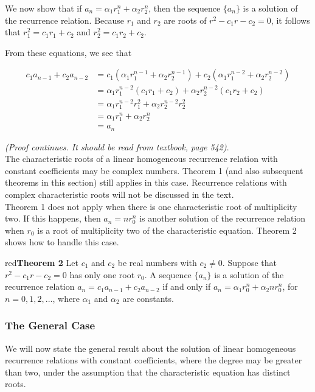 \documentclass[11pt]{article}
\newenvironment{theorem}[1]{\begin{mybox}{red}{\textbf{Theorem #1}}}{\end{mybox}}
\begin{document}
We now show that if $a_n = \alpha_1r^n_1 + \alpha_2r^n_2$, then the sequence $\{a_n\}$ is a solution of the recurrence relation. Because $r_1$ and $r_2$ are roots of $r^2 - c_1r - c_2 = 0$, it follows that $r^2_1 = c_1r_1 + c_2$ and $r^2_2 = c_1r_2 + c_2$.

From these equations, we see that

\begin{align*}
    c_1a_{n-1} + c_2a_{n-2} &= c_1(\alpha_1r^{n-1}_1 + \alpha_2r^{n-1}_2) + c_2(\alpha_1r_1^{n-2} + \alpha_2r_2^{n-2})\\
    &= \alpha_1r^{n-2}_1(c_1r_1 + c_2) + \alpha_2r^{n-2}_2(c_1r_2 + c_2)\\
    &= \alpha_1r^{n-2}_1r_1^2 + \alpha_2r^{n-2}_2r_2^2\\
    &= \alpha_1r^n_1 + \alpha_2r^n_2\\
    &= a_n
\end{align*}

\textit{(Proof continues. It should be read from textbook, page 542)}.\\

The characteristic roots of a linear homogeneous recurrence relation with constant coefficients may be complex numbers. Theorem 1 (and also subsequent theorems in this section) still applies in this case. Recurrence relations with complex characteristic roots will not be discussed in the text. \\

Theorem 1 does not apply when there is one characteristic root of multiplicity two. If this happens, then $a_n = nr^n_0$ is another solution of the recurrence relation when $r_0$ is a root of multiplicity two of the characteristic equation. Theorem 2 shows how to handle this case.

\begin{theorem}{2}
Let $c_1$ and $c_2$ be real numbers with $c_2 \neq 0$. Suppose that $r^2 - c_1 r - c_2 = 0$ has only one root $r_0$. A sequence $\{a_n\}$ is a solution of the recurrence relation $a_n = c_1a_{n-1} + c_2a_{n-2}$ if and only if $a_n = \alpha_1 r^n_0 + \alpha_2 nr^n_0$, for $n = 0, 1, 2, ...$, where $\alpha_1$ and $\alpha_2$ are constants.
\end{theorem}

\subsubsection{The General Case}

We will now state the general result about the solution of linear homogeneous recurrence relations with constant coefficients, where the degree may be greater than two, under the assumption that the characteristic equation has distinct roots.
\end{document}
